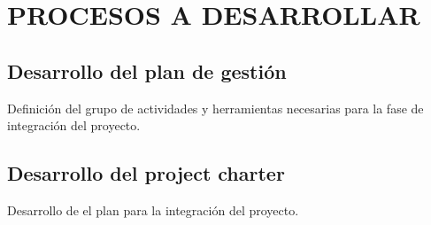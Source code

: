 \chapter{PROCESOS A DESARROLLAR}
%
\section{Desarrollo del plan de gesti\'on}
%
Definici\'on del grupo de actividades y herramientas necesarias para la fase de integraci\'on del proyecto.
%
\section{Desarrollo del project charter}
%
Desarrollo de el plan para la integraci\'on del proyecto.